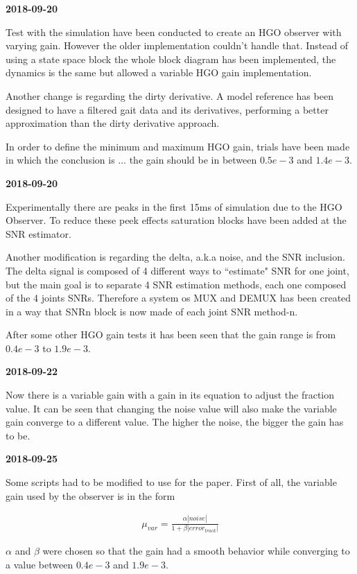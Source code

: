\textbf{2018-09-20}

Test with the simulation have been conducted to create an HGO observer with varying gain. However the older implementation couldn't handle that. Instead of using a state space block the whole block diagram has been implemented, the dynamics is the same but allowed a variable HGO gain implementation.

Another change is regarding the dirty derivative. A model reference has been designed to have a filtered gait data and its derivatives, performing a better approximation than the dirty derivative approach.

In order to define the minimum and maximum HGO gain, trials have been made in which the conclusion is ... the gain should be in between $0.5e-3$ and $1.4e-3$.

\textbf{2018-09-20}

Experimentally there are peaks in the first 15ms of simulation due to the HGO Observer. To reduce these peek effects saturation blocks have been added at the SNR estimator.

Another modification is regarding the delta, a.k.a noise, and the SNR inclusion. The delta signal is composed of 4 different ways to ``estimate" SNR for one joint, but the main goal is to separate 4 SNR estimation methods, each one composed of the 4 joints SNRs. Therefore a system os MUX and DEMUX has been created in a way that SNRn block is now made of each joint SNR method-n.

After some other HGO gain tests it has been seen that the gain range is from $0.4e-3$ to $1.9e-3$.

\textbf{2018-09-22}

Now there is a variable gain with a gain in its equation to adjust the fraction value. It can be seen that changing the noise value will also make the variable gain converge to a different value. The higher the noise, the bigger the gain has to be.

\textbf{2018-09-25}

Some scripts had to be modified to use for the paper. First of all, the variable gain used by the observer is in the form 

\begin{align}
    \mu_{var} = \frac{\alpha |noise|}{1 + \beta |error_{track}|} 
\end{align}

$\alpha$ and $\beta$ were chosen so that the gain had a smooth behavior while converging to a value between $0.4e-3$ and $1.9e-3$.

